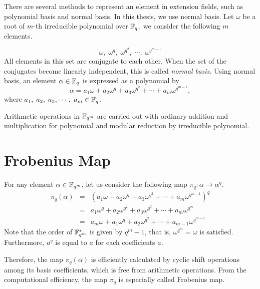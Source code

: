 There are several methods to represent an element in extension fields, such as polynomial basis and normal basis.
In this thesis, we use normal basis.
Let $\omega$ be a root of $m$-th irreducible polynomial over ${\mathbb{F}}_{q^{}}$, we consider the following $m$ elements.

\begin{equation}
\omega,\;\omega^q,\;\omega^{q^2},\;\cdots,\;\omega^{q^{m-1}} \nonumber
\end{equation}
All elements in this set are conjugate to each other.
When the set of the conjugates become linearly independent, this is called {\it normal basis}.
Using normal basis, an element $\alpha \in {\mathbb{F}}_{q^{}}$ is expressed as a polynomial by  
\begin{equation}
\alpha = a_1 \omega + a_2 \omega^q + a_3 \omega^{q^2} + \cdots + a_m \omega^{q^{m-1}}, 
\end{equation}
where $a_1,\;a_2,\;a_3,\cdots,\;a_m \in {\mathbb{F}}_{q^{}}$.

Arithmetic operations in ${\mathbb{F}}_{q^{m}}$ are carried out with ordinary addition and multiplication for polynomial and modular reduction by irreducible polynomial.

\section{Frobenius Map}
\label{sec:chap:fund:frobeniusmap}

For any element $\alpha \in {\mathbb{F}}_{q^{m}}$, let us consider the following map $\pi_q:\alpha \rightarrow \alpha^q$. 
\begin{eqnarray}
\pi_q(\alpha) &=& \left( a_1 \omega + a_2 \omega^q + a_3 \omega^{q^2} + \cdots + a_m \omega^{q^{m-1}} \right)^q \nonumber \\ 
&=& a_1 \omega^q + a_2 \omega^{q^2} + a_3 \omega^{q^3} + \cdots + a_m \omega^{q^m} \nonumber \\
&=& a_m \omega + a_1 \omega^q + a_2 \omega^{q^2} + \cdots + a_{m-1} \omega^{q^{m-1}}
\end{eqnarray}
Note that the order of ${\mathbb{F}}_{q^{m}}^*$ is given by $q^m - 1$, that is,  $\omega^{q^m} = \omega$ is satisfied.
Furthermore, $a^q$ is equal to $a$ for each coefficients $a$.

Therefore, the map $\pi_q(\alpha)$ is efficiently calculated by cyclic shift operations among its basis coefficients, 
which is free from arithmetic operations.
From the computational efficiency, the map $\pi_q$ is especially called Frobenius map.

